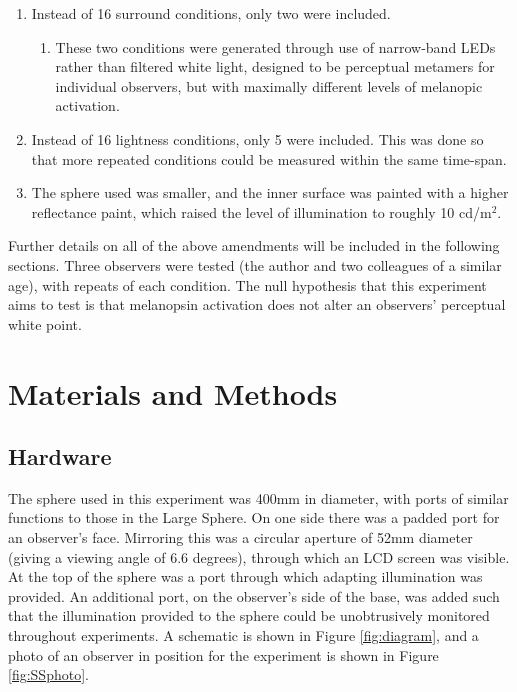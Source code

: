 \begin{enumerate}
    \item Instead of 16 surround conditions, only two were included.
    \begin{enumerate}
        \item These two conditions were generated through use of narrow-band \glspl{LED} rather than filtered white light, designed to be perceptual metamers for individual observers, but with maximally different levels of melanopic activation.
    \end{enumerate}
    \item Instead of 16 lightness conditions, only 5 were included. This was done so that more repeated conditions could be measured within the same time-span.
    \item The sphere used was smaller, and the inner surface was painted with a higher reflectance paint, which raised the level of illumination to roughly 10 cd/m$^2$.
\end{enumerate}

Further details on all of the above amendments will be included in the following sections. Three observers were tested (the author and two colleagues of a similar age), with repeats of each condition. The null hypothesis that this experiment aims to test is that melanopsin activation does not alter an observers' perceptual white point.

\section{Materials and Methods}

\subsection{Hardware}

The sphere used in this experiment was 400mm in diameter, with ports of similar functions to those in the Large Sphere. On one side there was a padded port for an observer's face. Mirroring this was a circular aperture of 52mm diameter (giving a viewing angle of 6.6 degrees), through which an LCD screen was visible. At the top of the sphere was a port through which adapting illumination was provided. An additional port, on the observer's side of the base, was added such that the illumination provided to the sphere could be unobtrusively monitored throughout experiments. A schematic is shown in Figure \ref{fig:diagram}, and a photo of an observer in position for the experiment is shown in Figure \ref{fig:SSphoto}.

